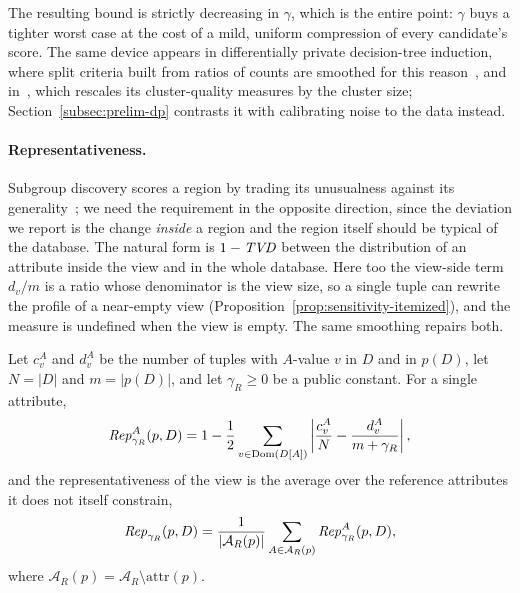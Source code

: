 The resulting bound is strictly decreasing in $\gamma$, which is the entire point: $\gamma$ buys a tighter worst case at the cost of a mild, uniform compression of every candidate's score.
The same device appears in differentially private decision-tree induction, where split criteria built from ratios of counts are smoothed for this reason~\cite{FriedmanSchuster10}, and in~\cite{DPClustX}, which rescales its cluster-quality measures by the cluster size; Section~\ref{subsec:prelim-dp} contrasts it with calibrating noise to the data instead.

\paragraph{Representativeness.}
Subgroup discovery scores a region by trading its unusualness against its generality~\cite{Wrobel97,HerreraCGJ11}; we need the requirement in the opposite direction, since the deviation we report is the change \emph{inside} a region and the region itself should be typical of the database.
The natural form is $1-\mathit{TVD}$ between the distribution of an attribute inside the view and in the whole database.
Here too the view-side term $d_v/m$ is a ratio whose denominator is the view size, so a single tuple can rewrite the profile of a near-empty view (Proposition~\ref{prop:sensitivity-itemized}), and the measure is undefined when the view is empty.
The same smoothing repairs both.

\begin{definition}
\label{def:rep}
Let $c^A_v$ and $d^A_v$ be the number of tuples with $A$-value $v$ in $D$ and in $p(D)$, let $N=|D|$ and $m=|p(D)|$, and let $\gamma_R\ge0$ be a public constant.
For a single attribute,
\begin{equation}
\mathit{Rep}^A_{\gamma_R}(p,D)=1-\frac{1}{2}\sum_{v\in\operatorname{Dom}(D[A])}\left|\frac{c^A_v}{N}-\frac{d^A_v}{m+\gamma_R}\right| ,
\label{eq:representativeness-proxy}
\end{equation}
and the representativeness of the view is the average over the reference attributes it does not itself constrain,
\begin{equation}
\mathit{Rep}_{\gamma_R}(p,D)=\frac{1}{|\mathcal{A}_R(p)|}\sum_{A\in\mathcal{A}_R(p)}\mathit{Rep}^A_{\gamma_R}(p,D),
\label{eq:rep-average}
\end{equation}
where $\mathcal{A}_R(p)=\mathcal{A}_R\setminus\mathrm{attr}(p)$.
\end{definition}

